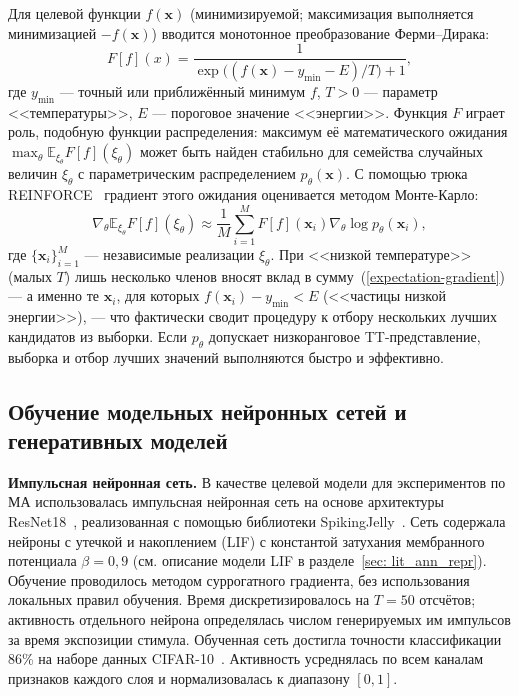 Для целевой функции $f(\mathbf{x})$ (минимизируемой; максимизация выполняется минимизацией $-f(\mathbf{x})$) вводится монотонное преобразование Ферми--Дирака:
\begin{equation}\label{eq:fermi_dirac}
    F[f](x) = \frac{1}{
        \exp \bigl(
            (f(\mathbf{x}) - y_{\text{min}} - E) / T
        \bigr)
        + 1
    },
\end{equation}
где $y_\text{min}$ --- точный или приближённый минимум $f$, $T>0$ --- параметр <<температуры>>, $E$ --- пороговое значение <<энергии>>. Функция $F$ играет роль, подобную функции распределения: максимум её математического ожидания $\max_\theta \mathbb{E}_{\xi_\theta} F[f](\xi_\theta)$ может быть найден стабильно для семейства случайных величин $\xi_\theta$ с параметрическим распределением $p_\theta(\mathbf{x})$. С помощью трюка REINFORCE~\cite{REINFORCE-trick} градиент этого ожидания оценивается методом Монте-Карло:
\begin{equation}
    \nabla_\theta\mathbb{E}_{\xi_\theta}F[f](\xi_\theta)\approx \frac{1}{M}\sum_{i=1}^M
    F[f](\mathbf{x}_i)\nabla_\theta \log p_\theta(\mathbf{x}_i),
    \label{expectation-gradient}
\end{equation}
где $\{\mathbf{x}_i\}_{i=1}^{M}$ --- независимые реализации $\xi_\theta$. При <<низкой температуре>> (малых $T$) лишь несколько членов вносят вклад в сумму~(\ref{expectation-gradient}) --- а именно те $\mathbf{x}_i$, для которых $f(\mathbf{x}_i)-y_\text{min}<E$ (<<частицы низкой энергии>>), --- что фактически сводит процедуру к отбору нескольких лучших кандидатов из выборки. Если $p_\theta$ допускает низкоранговое TT-представление, выборка и отбор лучших значений выполняются быстро и эффективно.



\subsection{Обучение модельных нейронных сетей и генеративных моделей}\label{sec:mango_models}

\textbf{Импульсная нейронная сеть.}
В качестве целевой модели для экспериментов по МА использовалась импульсная нейронная сеть на основе архитектуры ResNet18~\cite{ResNet-paper}, реализованная с помощью библиотеки SpikingJelly~\cite{SpikingJelly-paper}. Сеть содержала нейроны с утечкой и накоплением (LIF) с константой затухания мембранного потенциала $\beta = 0{,}9$ (см. описание модели LIF в разделе~\ref{sec: lit_ann_repr}). Обучение проводилось методом суррогатного градиента, без использования локальных правил обучения. Время дискретизировалось на $T = 50$ отсчётов; активность отдельного нейрона определялась числом генерируемых им импульсов за время экспозиции стимула. Обученная сеть достигла точности классификации 86\% на наборе данных CIFAR-10~\cite{CIFAR10-dataset-reference}. Активность усреднялась по всем каналам признаков каждого слоя и нормализовалась к диапазону $[0, 1]$.

